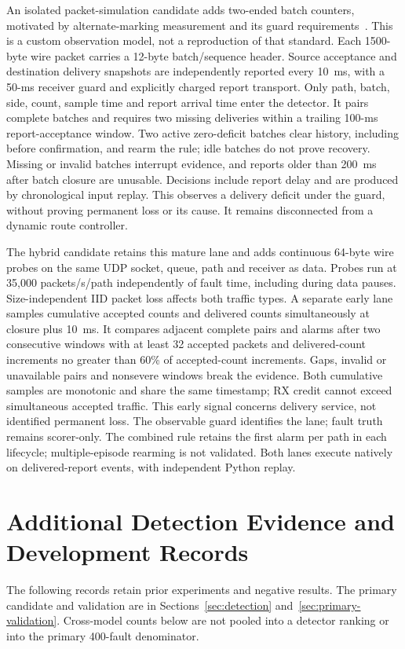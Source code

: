 \documentclass[sigconf]{acmart}
\begin{document}
An isolated packet-simulation candidate adds two-ended batch counters,
motivated by alternate-marking measurement and its guard requirements~\cite{alternateMarking2022}.
This is a custom observation model, not a reproduction of that standard.
Each 1500-byte wire packet carries a 12-byte batch/sequence header.
Source acceptance and destination delivery snapshots are independently
reported every 10~ms, with a 50-ms receiver guard and explicitly charged
report transport. Only path, batch, side, count, sample time and report
arrival time enter the detector. It pairs complete batches and requires
two missing deliveries within a trailing 100-ms report-acceptance window.
Two active zero-deficit batches clear history, including before
confirmation, and rearm the rule; idle batches do not prove recovery.
Missing or invalid batches interrupt evidence, and reports older than
200~ms after batch closure are unusable. Decisions include report delay
and are produced by chronological input replay. This observes a delivery
deficit under the guard, without proving permanent loss or its cause.
It remains disconnected from a dynamic route controller.

The hybrid candidate retains this mature lane and adds continuous
64-byte wire probes on the same UDP socket, queue, path and receiver as
data. Probes run at 35,000 packets/s/path independently of fault time,
including during data pauses. Size-independent IID packet loss affects
both traffic types. A separate early lane samples cumulative accepted
counts and delivered counts simultaneously at closure plus 10~ms. It compares
adjacent complete pairs and alarms after two consecutive windows with at
least 32 accepted packets and delivered-count increments no greater than
60\% of accepted-count increments. Gaps, invalid or unavailable pairs and
nonsevere windows break the evidence. Both cumulative samples are monotonic and share the same timestamp;
RX credit cannot exceed simultaneous accepted traffic.
This early signal concerns delivery service, not identified permanent
loss. The observable guard identifies the lane; fault truth remains
scorer-only. The combined rule retains the first alarm per path in each
lifecycle; multiple-episode rearming is not validated. Both lanes execute
natively on delivered-report events, with independent Python replay.

\section{Additional Detection Evidence and Development Records}
\label{app:detection-evidence}
The following records retain prior experiments and negative results.
The primary candidate and validation are in Sections~\ref{sec:detection}
and~\ref{sec:primary-validation}. Cross-model counts below are not pooled
into a detector ranking or into the primary 400-fault denominator.
\end{document}
